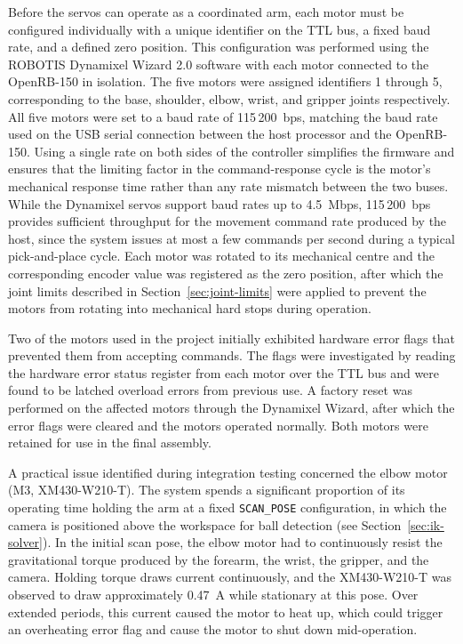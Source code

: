 \label{sec:motor-config}
Before the servos can operate as a coordinated arm, each motor 
must be configured individually with a unique identifier on the 
TTL bus, a fixed baud rate, and a defined zero position. This 
configuration was performed using the ROBOTIS Dynamixel Wizard 
2.0 software with each motor connected to the OpenRB-150 in 
isolation. The five motors were assigned identifiers 1 through 5, 
corresponding to the base, shoulder, elbow, wrist, and gripper 
joints respectively. All five motors were set to a baud rate of 115\,200~bps, matching 
the baud rate used on the USB serial connection between the host 
processor and the OpenRB-150. Using a single rate on both sides 
of the controller simplifies the firmware and ensures that the 
limiting factor in the command-response cycle is the motor's 
mechanical response time rather than any rate mismatch between 
the two buses. While the Dynamixel servos support baud rates up 
to 4.5~Mbps, 115\,200~bps provides sufficient throughput for the 
movement command rate produced by the host, since the system 
issues at most a few commands per second during a typical 
pick-and-place cycle. Each motor 
was rotated to its mechanical centre and the corresponding encoder 
value was registered as the zero position, after which the joint 
limits described in Section~\ref{sec:joint-limits} were applied to prevent 
the motors from rotating into mechanical hard stops during 
operation.

Two of the motors used in the project initially exhibited 
hardware error flags that prevented them from accepting commands. 
The flags were investigated by reading the hardware error status 
register from each motor over the TTL bus and were found to be 
latched overload errors from previous use. A factory reset was 
performed on the affected motors through the Dynamixel Wizard, 
after which the error flags were cleared and the motors operated 
normally. Both motors were retained for use in the final assembly.

\label{sec:thermal}
A practical issue identified during integration testing concerned 
the elbow motor (M3, XM430-W210-T). The system spends a significant 
proportion of its operating time holding the arm at a fixed 
\texttt{SCAN\_POSE} configuration, in which the camera is positioned 
above the workspace for ball detection (see Section~\ref{sec:ik-solver}). 
In the initial scan pose, the elbow motor had to continuously resist 
the gravitational torque produced by the forearm, the wrist, the 
gripper, and the camera. Holding torque draws current continuously, 
and the XM430-W210-T was observed to draw approximately 0.47~A while 
stationary at this pose. Over extended periods, this current caused 
the motor to heat up, which could trigger an overheating error flag 
and cause the motor to shut down mid-operation.

